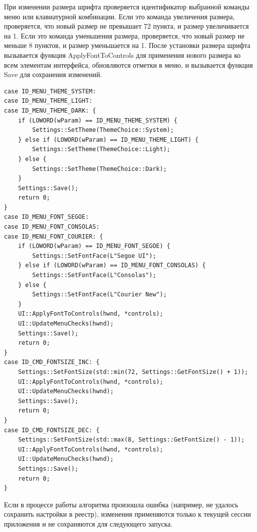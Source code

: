 При изменении размера шрифта проверяется идентификатор выбранной команды меню или клавиатурной комбинации. Если это команда увеличения размера, проверяется, что новый размер не превышает 72 пункта, и размер увеличивается на 1. Если это команда уменьшения размера, проверяется, что новый размер не меньше 8 пунктов, и размер уменьшается на 1. После установки размера шрифта вызывается функция ApplyFontToControls для применения нового размера ко всем элементам интерфейса, обновляются отметки в меню, и вызывается функция Save для сохранения изменений.

\begin{lstlisting}[style=CodeListing]
case ID_MENU_THEME_SYSTEM:
case ID_MENU_THEME_LIGHT:
case ID_MENU_THEME_DARK: {
    if (LOWORD(wParam) == ID_MENU_THEME_SYSTEM) {
        Settings::SetTheme(ThemeChoice::System);
    } else if (LOWORD(wParam) == ID_MENU_THEME_LIGHT) {
        Settings::SetTheme(ThemeChoice::Light);
    } else {
        Settings::SetTheme(ThemeChoice::Dark);
    }
    Settings::Save();
    return 0;
}
case ID_MENU_FONT_SEGOE:
case ID_MENU_FONT_CONSOLAS:
case ID_MENU_FONT_COURIER: {
    if (LOWORD(wParam) == ID_MENU_FONT_SEGOE) {
        Settings::SetFontFace(L"Segoe UI");
    } else if (LOWORD(wParam) == ID_MENU_FONT_CONSOLAS) {
        Settings::SetFontFace(L"Consolas");
    } else {
        Settings::SetFontFace(L"Courier New");
    }
    UI::ApplyFontToControls(hwnd, *controls);
    UI::UpdateMenuChecks(hwnd);
    Settings::Save();
    return 0;
}
case ID_CMD_FONTSIZE_INC: {
    Settings::SetFontSize(std::min(72, Settings::GetFontSize() + 1));
    UI::ApplyFontToControls(hwnd, *controls);
    UI::UpdateMenuChecks(hwnd);
    Settings::Save();
    return 0;
}
case ID_CMD_FONTSIZE_DEC: {
    Settings::SetFontSize(std::max(8, Settings::GetFontSize() - 1));
    UI::ApplyFontToControls(hwnd, *controls);
    UI::UpdateMenuChecks(hwnd);
    Settings::Save();
    return 0;
}
\end{lstlisting}

Если в процессе работы алгоритма произошла ошибка (например, не удалось сохранить настройки в реестр), изменения применяются только к текущей сессии приложения и не сохраняются для следующего запуска.